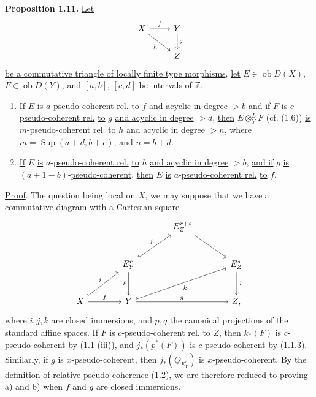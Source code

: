\textbf{Proposition 1.11.} \uline{Let}
\[
\begin{tikzcd}
X \arrow[r,"f"] \arrow[dr,"h"'] & Y \arrow[d,"g"]\\
& Z
\end{tikzcd}
\]
\uline{be a commutative triangle of locally finite type morphisms}, \uline{let} \(E\in\operatorname{ob} D(X)\), \(F\in\operatorname{ob} D(Y)\), \uline{and} \([a,b]\), \([c,d]\) \uline{be intervals of} \(\mathbb Z\).
\begin{enumerate}[label=\alph*)]
\item \uline{If} \(E\) \uline{is} \(a\)-\uline{pseudo-coherent rel.} \uline{to} \(f\) \uline{and acyclic in degree} \(>b\) \uline{and if} \(F\) \uline{is} \(c\)-\uline{pseudo-coherent rel.} \uline{to} \(g\) \uline{and acyclic in degree} \(>d\), \uline{then} \(E\otimes_Y^{L}F\) (cf. (1.6)) \uline{is} \(m\)-\uline{pseudo-coherent rel.} \uline{to} \(h\) \uline{and acyclic in degree} \(>n\), \uline{where} \(m=\operatorname{Sup}(a+d,b+c)\), \uline{and} \(n=b+d\).

\item \uline{If} \(E\) \uline{is} \(a\)-\uline{pseudo-coherent rel.} \uline{to} \(h\) \uline{and acyclic in degree} \(>b\), \uline{and if} \(g\) \uline{is} \((a+1-b)\)-\uline{pseudo-coherent}, \uline{then} \(E\) \uline{is} \(a\)-\uline{pseudo-coherent rel.} \uline{to} \(f\).
\end{enumerate}

\uline{Proof}. The question being local on \(X\), we may suppose that we have a commutative diagram with a Cartesian square
\[
\begin{tikzcd}[column sep=large,row sep=large]
& & E^{r+s}_Z \arrow[dr] & \\
& E^r_Y \arrow[ur,hook,"j"] \arrow[d,"p"'] & & E^s_Z \arrow[d,"q"]\\
X \arrow[ur,hook,"i"] \arrow[r,"f"] & Y \arrow[urr,hook,"k"'] \arrow[rr,"g"] & & Z{,}
\end{tikzcd}
\]
where \(i,j,k\) are closed immersions, and \(p,q\) the canonical projections of the standard affine spaces. If \(F\) is \(c\)-pseudo-coherent rel. to \(Z\), then \(k_*(F)\) is \(c\)-pseudo-coherent by (1.1 (iii)), and \(j_*(p^*(F))\) is \(c\)-pseudo-coherent by (1.1.3). Similarly, if \(g\) is \(x\)-pseudo-coherent, then \(j_*(\underline{O}_{E^r_Y})\) is \(x\)-pseudo-coherent. By the definition of relative pseudo-coherence (1.2), we are therefore reduced to proving a) and b) when \(f\) and \(g\) are closed immersions.

